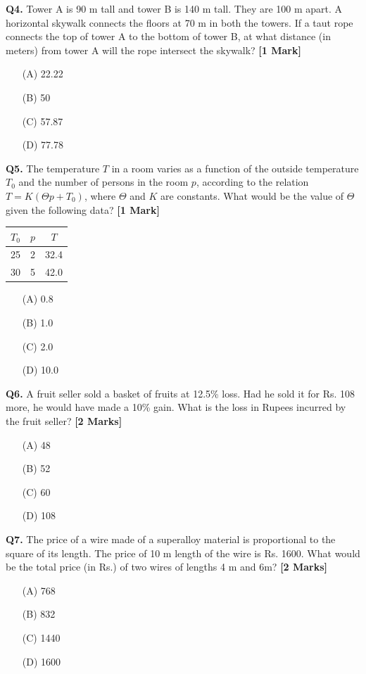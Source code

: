 \documentclass[11pt]{article}
\newcommand{\questiona}[2]{
    \noindent\textbf{Q#2.} #1 \hfill \textbf{[1 Mark]}
}
\newcommand{\questionb}[2]{
    \noindent\textbf{Q#2.} #1 \hfill \textbf{[2 Marks]}
}
\begin{document}
\questiona{Tower A is 90 m tall and tower B is 140 m tall. They are 100 m apart. A horizontal skywalk connects the floors at 70 m in both the towers. If a taut rope connects the top of tower A to the bottom of tower B, at what distance (in meters) from tower A will the rope intersect the skywalk?}{4}
\begin{enumerate}
    \item[(A)] 22.22  
    \item[(B)] 50  
    \item[(C)] 57.87  
    \item[(D)] 77.78  
\end{enumerate}
\vspace{0.5cm}

\questiona{The temperature \( T \) in a room varies as a function of the outside temperature \( T_0 \) and the number of persons in the room \( p \), according to the relation \( T = K (\Theta p + T_0) \), where \(\Theta\) and \( K \) are constants. What would be the value of \(\Theta\) given the following data?}{5}

\begin{tabular}{|c|c|c|}
\hline
\( T_0 \) & \( p \) & \( T \) \\
\hline
25 & 2 & 32.4 \\
30 & 5 & 42.0 \\
\hline
\end{tabular}

\begin{enumerate}
    \item[(A)] 0.8  
    \item[(B)] 1.0  
    \item[(C)] 2.0  
    \item[(D)] 10.0  
\end{enumerate}
\vspace{0.5cm}

\questionb{A fruit seller sold a basket of fruits at 12.5\% loss. Had he sold it for Rs. 108 more, he would have made a 10\% gain. What is the loss in Rupees incurred by the fruit seller?}{6}
\begin{enumerate}
    \item[(A)] 48  
    \item[(B)] 52  
    \item[(C)] 60  
    \item[(D)] 108  
\end{enumerate}
\vspace{0.5cm}

\questionb{The price of a wire made of a superalloy material is proportional to the square of its length. The price of 10 m length of the wire is Rs. 1600. What would be the total price (in Rs.) of two wires of lengths 4 m and 6m?}{7}
\begin{enumerate}
    \item[(A)] 768  
    \item[(B)] 832  
    \item[(C)] 1440  
    \item[(D)] 1600  
\end{enumerate}
\vspace{0.5cm}
\end{document}
